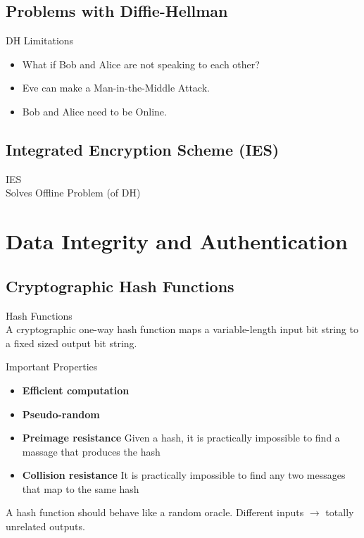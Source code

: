 \subsection{Problems with Diffie-Hellman}

\begin{concept}{DH Limitations}\\
    \begin{itemize}
        \item What if Bob and Alice are not speaking to each other?
        \item Eve can make a Man-in-the-Middle Attack.
        \item Bob and Alice need to be Online.
    \end{itemize}
\end{concept}

\subsection{Integrated Encryption Scheme (IES)}

\begin{concept}{IES}\\
    Solves Offline Problem (of DH)
\end{concept}

\section{Data Integrity and Authentication}

\subsection{Cryptographic Hash Functions}

\begin{definition}{Hash Functions}\\
    A cryptographic one-way hash function maps a variable-length input bit string to a fixed sized output bit string.
\end{definition}

\begin{concept}{Important Properties}\\
    \begin{itemize}
        \item \textbf{Efficient computation}
        \item \textbf{Pseudo-random}
        \item \textbf{Preimage resistance} Given a hash, it is practically impossible to find a massage that produces the hash
        \item \textbf{Collision resistance} It is practically impossible to find any two messages that map to the same hash
    \end{itemize}
    
    A hash function should behave like a random oracle. Different inputs $\rightarrow$ totally unrelated outputs.
\end{concept}

